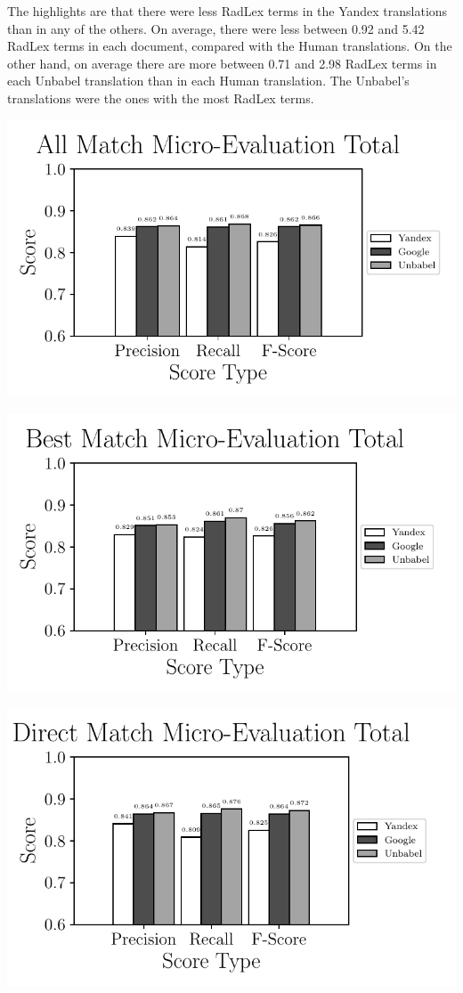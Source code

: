 The highlights are that there were less RadLex terms in the Yandex translations than in any of the others. On average, there were less between 0.92 and 5.42 RadLex terms in each document, compared with the Human translations. On the other hand, on average there are more between 0.71 and 2.98 RadLex terms in each Unbabel translation than in each Human translation. The Unbabel's translations were the ones with the most RadLex terms. 

\includegraphics{SupportFiles/plots/all_match_micro_total_plot.pdf}

\includegraphics{SupportFiles/plots/best_match_micro_total_plot.pdf}

\includegraphics{SupportFiles/plots/direct_match_micro_total_plot.pdf}


